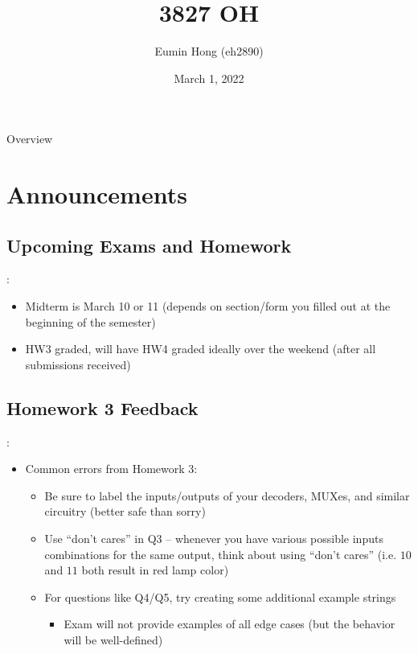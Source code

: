 \documentclass{../slides}
\title{3827 OH}
\author{Eumin Hong (eh2890)}
\institute{Columbia University}
\date{March 1, 2022}
\begin{document}
\begin{frame}
    \titlepage
\end{frame}

\begin{frame}{Overview}
\begin{multicols}{2}
\tableofcontents
\end{multicols}
\end{frame}

\section{Announcements}
\subsection{Upcoming Exams and Homework}
\begin{frame}{\secname: \subsecname}
    \begin{itemize}
        \item Midterm is March 10 or 11 (depends on section/form you filled out at the beginning of the semester)
        \item HW3 graded, will have HW4 graded ideally over the weekend (after all submissions received)
    \end{itemize}
\end{frame}

\subsection{Homework 3 Feedback}
\begin{frame}{\secname: \subsecname}
    \begin{itemize}
        \item Common errors from Homework 3:
        \begin{itemize}
            \item Be sure to label the inputs/outputs of your decoders, MUXes, and similar circuitry (better safe than sorry)
            \item Use \enquote{don't cares} in Q3 -- whenever you have various possible inputs combinations for the same output, think about using \enquote{don't cares} (i.e. $10$ and $11$ both result in red lamp color)
            \item For questions like Q4/Q5, try creating some additional example strings
            \begin{itemize}
                \item Exam will not provide examples of all edge cases (but the behavior will be well-defined)
            \end{itemize}
        \end{itemize}
    \end{itemize}
\end{frame}
\end{document}
